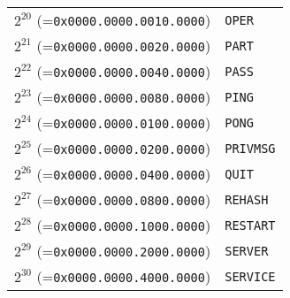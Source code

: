 \documentclass[documentation]{subfiles}
\begin{document}
\begin{minipage}{0.49\textwidth}
\begin{longtable}{rl}
        $2^{20}$ (={\tt 0x0000.0000.0010.0000}) & {\tt OPER   }\\
        $2^{21}$ (={\tt 0x0000.0000.0020.0000}) & {\tt PART   }\\
        $2^{22}$ (={\tt 0x0000.0000.0040.0000}) & {\tt PASS   }\\
        $2^{23}$ (={\tt 0x0000.0000.0080.0000}) & {\tt PING   }\\
        $2^{24}$ (={\tt 0x0000.0000.0100.0000}) & {\tt PONG   }\\
        $2^{25}$ (={\tt 0x0000.0000.0200.0000}) & {\tt PRIVMSG}\\
        $2^{26}$ (={\tt 0x0000.0000.0400.0000}) & {\tt QUIT   }\\
        $2^{27}$ (={\tt 0x0000.0000.0800.0000}) & {\tt REHASH }\\
        $2^{28}$ (={\tt 0x0000.0000.1000.0000}) & {\tt RESTART}\\
        $2^{29}$ (={\tt 0x0000.0000.2000.0000}) & {\tt SERVER }\\
        $2^{30}$ (={\tt 0x0000.0000.4000.0000}) & {\tt SERVICE}\\
        \bottomrule
    \end{longtable}
\end{minipage}
\end{document}
